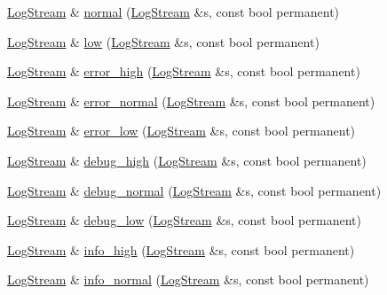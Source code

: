 \begin{DoxyCompactItemize}
\hyperlink{classkisscpp_1_1_log_stream}{Log\-Stream} \& \hyperlink{namespacekisscpp_1_1manip_adf0550f278ff821441ada6dd998af178}{normal} (\hyperlink{classkisscpp_1_1_log_stream}{Log\-Stream} \&s, const bool permanent)
\item 
\hyperlink{classkisscpp_1_1_log_stream}{Log\-Stream} \& \hyperlink{namespacekisscpp_1_1manip_a11159fc8dd5d521c86492de7ed2ae568}{low} (\hyperlink{classkisscpp_1_1_log_stream}{Log\-Stream} \&s, const bool permanent)
\item 
\hyperlink{classkisscpp_1_1_log_stream}{Log\-Stream} \& \hyperlink{namespacekisscpp_1_1manip_a5972fe83732cb8ba6300185389d22ddb}{error\-\_\-high} (\hyperlink{classkisscpp_1_1_log_stream}{Log\-Stream} \&s, const bool permanent)
\item 
\hyperlink{classkisscpp_1_1_log_stream}{Log\-Stream} \& \hyperlink{namespacekisscpp_1_1manip_afdc850f7fe0e092d671b7c6479b03d93}{error\-\_\-normal} (\hyperlink{classkisscpp_1_1_log_stream}{Log\-Stream} \&s, const bool permanent)
\item 
\hyperlink{classkisscpp_1_1_log_stream}{Log\-Stream} \& \hyperlink{namespacekisscpp_1_1manip_a9a44ab7028cdfcb6db302b0fb19e54d1}{error\-\_\-low} (\hyperlink{classkisscpp_1_1_log_stream}{Log\-Stream} \&s, const bool permanent)
\item 
\hyperlink{classkisscpp_1_1_log_stream}{Log\-Stream} \& \hyperlink{namespacekisscpp_1_1manip_ac496d5f1a7f553592a8c49738accaa4c}{debug\-\_\-high} (\hyperlink{classkisscpp_1_1_log_stream}{Log\-Stream} \&s, const bool permanent)
\item 
\hyperlink{classkisscpp_1_1_log_stream}{Log\-Stream} \& \hyperlink{namespacekisscpp_1_1manip_a4ecc1a599b067a734e3f320bda9eab0b}{debug\-\_\-normal} (\hyperlink{classkisscpp_1_1_log_stream}{Log\-Stream} \&s, const bool permanent)
\item 
\hyperlink{classkisscpp_1_1_log_stream}{Log\-Stream} \& \hyperlink{namespacekisscpp_1_1manip_a5e5923564d6fb200e5cfaea12bc8a9b6}{debug\-\_\-low} (\hyperlink{classkisscpp_1_1_log_stream}{Log\-Stream} \&s, const bool permanent)
\item 
\hyperlink{classkisscpp_1_1_log_stream}{Log\-Stream} \& \hyperlink{namespacekisscpp_1_1manip_a853f871c83288cb0bb4497bcec0cd53d}{info\-\_\-high} (\hyperlink{classkisscpp_1_1_log_stream}{Log\-Stream} \&s, const bool permanent)
\item 
\hyperlink{classkisscpp_1_1_log_stream}{Log\-Stream} \& \hyperlink{namespacekisscpp_1_1manip_a65c0a0f3d375100d63948829dff63ff8}{info\-\_\-normal} (\hyperlink{classkisscpp_1_1_log_stream}{Log\-Stream} \&s, const bool permanent)

\end{DoxyCompactItemize}
